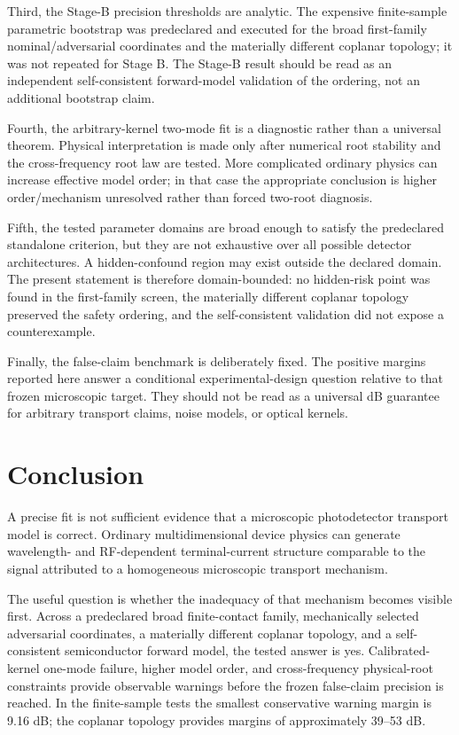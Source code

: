 \documentclass[11pt]{article}
\begin{document}
Third, the Stage-B precision thresholds are analytic. The expensive finite-sample parametric bootstrap was predeclared and executed for the broad first-family nominal/adversarial coordinates and the materially different coplanar topology; it was not repeated for Stage B. The Stage-B result should be read as an independent self-consistent forward-model validation of the ordering, not an additional bootstrap claim.

Fourth, the arbitrary-kernel two-mode fit is a diagnostic rather than a universal theorem. Physical interpretation is made only after numerical root stability and the cross-frequency root law are tested. More complicated ordinary physics can increase effective model order; in that case the appropriate conclusion is higher order/mechanism unresolved rather than forced two-root diagnosis.

Fifth, the tested parameter domains are broad enough to satisfy the predeclared standalone criterion, but they are not exhaustive over all possible detector architectures. A hidden-confound region may exist outside the declared domain. The present statement is therefore domain-bounded: no hidden-risk point was found in the first-family screen, the materially different coplanar topology preserved the safety ordering, and the self-consistent validation did not expose a counterexample.

Finally, the false-claim benchmark is deliberately fixed. The positive margins reported here answer a conditional experimental-design question relative to that frozen microscopic target. They should not be read as a universal dB guarantee for arbitrary transport claims, noise models, or optical kernels.

\section{Conclusion}

A precise fit is not sufficient evidence that a microscopic photodetector transport model is correct. Ordinary multidimensional device physics can generate wavelength- and RF-dependent terminal-current structure comparable to the signal attributed to a homogeneous microscopic transport mechanism.

The useful question is whether the inadequacy of that mechanism becomes visible first. Across a predeclared broad finite-contact family, mechanically selected adversarial coordinates, a materially different coplanar topology, and a self-consistent semiconductor forward model, the tested answer is yes. Calibrated-kernel one-mode failure, higher model order, and cross-frequency physical-root constraints provide observable warnings before the frozen false-claim precision is reached. In the finite-sample tests the smallest conservative warning margin is 9.16 dB; the coplanar topology provides margins of approximately 39--53 dB.
\end{document}

